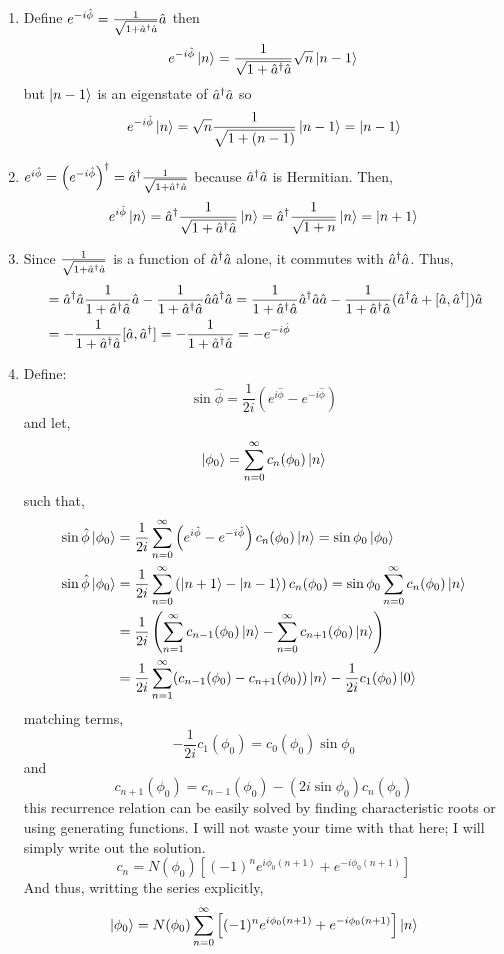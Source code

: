 \documentclass[12pt]{extarticle}
\begin{document}
\begin{enumerate}
\item Define $e^{- i \hat{\phi}} = \frac{1}{\sqrt{1 + \hat{a}^\dagger \hat{a}}} \hat{a}$ then \[e^{- i \hat{\phi}} \left| n \right> = \frac{1}{\sqrt{1 + \hat{a}^\dagger \hat{a}}} \sqrt{n} \left| n-1 \right>\]
but $\left| n-1 \right>$ is an eigenstate of $\hat{a}^\dagger \hat{a}$ so \[e^{- i \hat{\phi}} \left| n \right> = \sqrt{n} \frac{1}{\sqrt{1 + (n - 1)}} \left| n-1 \right> = \left| n-1 \right>\]

\item $e^{i \hat{\phi}} = \left(e^{- i \hat{\phi}}\right)^\dagger = \hat{a}^\dagger \frac{1}{\sqrt{1 + \hat{a}^\dagger \hat{a}}}$ because $\hat{a}^\dagger \hat{a}$ is Hermitian. Then, \[e^{i \hat{\phi}} \left| n \right> = \hat{a}^\dagger \frac{1}{\sqrt{1 + \hat{a}^\dagger \hat{a}}} \left| n \right> = \hat{a}^\dagger \frac{1}{\sqrt{1 + n}} \left| n \right> = \left| n+1 \right>\]

\item Since $\frac{1}{\sqrt{1 + \hat{a}^\dagger \hat{a}}}$ is a function of $\hat{a}^\dagger \hat{a}$ alone, it commutes with $\hat{a}^\dagger \hat{a}$. Thus, 
\begin{align*}
[\adag \a, e^{- \hat{\phi}}] &= \adag \a \frac{1}{1 + \adag \a} \a - \frac{1}{1 + \adag \a} \a \adag \a = \frac{1}{1 + \adag \a} \adag \a \a - \frac{1}{1 + \adag \a} (\adag \a + [\a, \adag]) \a \\ & = - \frac{1}{1 + \adag \a} [\a, \adag] = - \frac{1}{1 + \adag \a} = - e^{- i \hat{\phi}} 
\end{align*}

\item Define: \[\sin{\hat{\phi}} = \frac{1}{2i} \left( e^{i \hat{\phi}} - e^{-i \hat{\phi}} \right)\] and let, \[\left| \phi_0 \right> = \sum_{n = 0}^{\infty} c_n (\phi_0) \left| n \right>\]
such that, 
\begin{align*}
\sin{\hat{\phi}} \left| \phi_0 \right> &= \frac{1}{2i} \sum_{n = 0}^{\infty} \left( e^{i \hat{\phi}} - e^{-i \hat{\phi}} \right) c_n (\phi_0) \left| n \right>  = \sin{\phi_0} \left| \phi_0 \right> \\ 
\sin{\hat{\phi}} \left| \phi_0 \right> &= \frac{1}{2i} \sum_{n = 0}^{\infty} \left( \left| n + 1 \right> - \left| n - 1 \right> \right) c_n (\phi_0) = \sin{\phi_0} \sum_{n = 0}^{\infty} c_n (\phi_0) \left| n \right> \\ 
& = \frac{1}{2i} \left( \sum_{n = 1}^{\infty} c_{n - 1} (\phi_0) \left| n \right>   - \sum_{n = 0}^{\infty} c_{n + 1} (\phi_0) \left| n \right> \right)\\ & = \frac{1}{2i}  \sum_{n = 1}^{\infty} (c_{n - 1}(\phi_0) - c_{n + 1} (\phi_0)) \left| n \right> - \frac{1}{2i} c_1(\phi_0) \left| 0 \right>
\end{align*}
matching terms,
\[ -\frac{1}{2i} c_1(\phi_0) = c_0(\phi_0) \sin{\phi_0}\]
and 
\[c_{n + 1} (\phi_0) = c_{n - 1}(\phi_0) - (2i \sin{\phi_0}) c_{n}(\phi_0) \]
this recurrence relation can be easily solved by finding characteristic roots or using generating functions. I will not waste your time with that here; I will simply write out the solution.
\[c_n = N(\phi_0) \left[(-1)^n e^{i \phi_0 (n + 1)} + e^{- i \phi_0 (n + 1)} \right]\]
And thus, writting the series explicitly,
\[\left| \phi_0 \right> = N(\phi_0) \sum_{n = 0}^\infty \left[(-1)^n e^{i \phi_0 (n + 1)} + e^{- i \phi_0 (n + 1)} \right] \left| n \right> \]


\end{enumerate}
\end{document}
